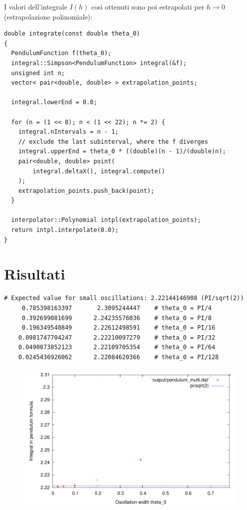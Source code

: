 \documentclass[a4paper]{article}
\begin{document}
I valori dell'integrale $I(h)$ così ottenuti sono poi estrapolati per 
$h\rightarrow0$ (estrapolazione polinomiale):
\begin{lstlisting} 
double integrate(const double theta_0)
{
  PendulumFunction f(theta_0);
  integral::Simpson<PendulumFunction> integral(&f);
  unsigned int n;
  vector< pair<double, double> > extrapolation_points;

  integral.lowerEnd = 0.0;

  for (n = (1 << 8); n < (1 << 22); n *= 2) {
    integral.nIntervals = n - 1;
    // exclude the last subinterval, where the f diverges
    integral.upperEnd = theta_0 * ((double)(n - 1)/(double)n);
    pair<double, double> point(
        integral.deltaX(), integral.compute()
    );
    extrapolation_points.push_back(point);
  }

  interpolator::Polynomial intpl(extrapolation_points);
  return intpl.interpolate(0.0);
}
\end{lstlisting}

\section{Risultati}
\begin{lstlisting}
# Expected value for small oscillations: 2.22144146908 (PI/sqrt(2))
     0.785398163397       2.3095244447    # theta_0 = PI/4
     0.392699081699      2.24235576036    # theta_0 = PI/8
     0.196349540849      2.22612498591    # theta_0 = PI/16
    0.0981747704247      2.22210097279    # theta_0 = PI/32
    0.0490873852123      2.22109705354    # theta_0 = PI/64
    0.0245436926062      2.22084620366    # theta_0 = PI/128
\end{lstlisting}
\begin{center}\begin{figure}\begin{center}
\includegraphics[width=130mm]{plot.pdf}
\end{center}\end{figure}\end{center}
\end{document}
